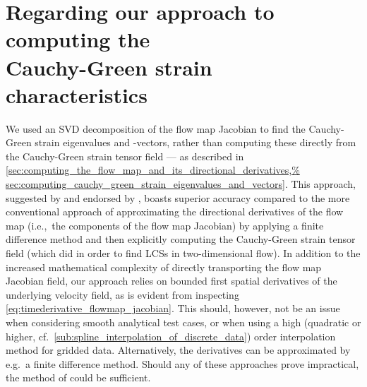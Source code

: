\section[Regarding our approach to computing the Cauchy-Green
strain characteristics] {Regarding our approach to computing the%
    \\\phantom{5.1} Cauchy-Green strain characteristics}
\label{sec:regarding_our_approach_to_computing_the_cauchy_green%
_strain_characteristics}

We used an SVD decomposition of the flow map Jacobian to find the Cauchy-Green
strain eigenvalues and -vectors, rather than computing these directly from the
Cauchy-Green strain tensor field --- as described in
\cref{sec:computing_the_flow_map_and_its_directional_derivatives,%
sec:computing_cauchy_green_strain_eigenvalues_and_vectors}. This approach,
suggested by \textcite{miron2012anisotropic} and endorsed by
\textcite{oettinger2016autonomous}, boasts superior accuracy compared to the
more conventional approach of approximating the directional derivatives of the
flow map (i.e.,\ the components of the flow map Jacobian) by applying a finite
difference method and then explicitly computing the Cauchy-Green strain
tensor field (which \textcite{farazmand2012computing} did in order to find LCSs
in two-dimensional flow). In addition to the increased mathematical complexity
of directly transporting the flow map Jacobian field, our approach relies on
bounded first spatial derivatives of the underlying velocity field, as is
evident from inspecting \cref{eq:timederivative_flowmap_jacobian}. This should,
however, not be an issue when considering smooth analytical test cases, or when
using a high (quadratic or higher, cf.\
\cref{sub:spline_interpolation_of_discrete_data}) order interpolation method
for gridded data. Alternatively, the derivatives can be approximated by e.g.\ a
finite difference method. Should any of these approaches prove impractical, the
method of \textcite{farazmand2012computing} could be sufficient.

